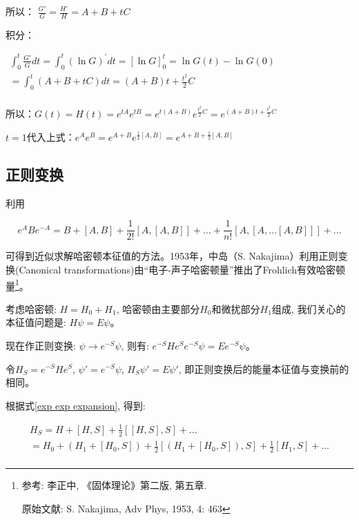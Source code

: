 所以： $\frac{{G'}}{G} = \frac{{H'}}{H} = A + B + tC$



积分：

$\begin{array}{l}
 \int_0^t {\frac{{G'}}{G}dt}  = \int_0^t {\left( {\ln G} \right)^\prime  dt}  = \left[ {\ln G} \right]_0^t  = \ln G\left( t \right) - \ln G\left( 0 \right) \\
  = \int_0^t {\left( {A + B + tC} \right)dt}  = \left( {A + B} \right)t + \frac{{t^2 }}{2}C \\
 \end{array}$


所以：$G\left( t \right) = H\left( t \right) = e^{tA} e^{tB}  = e^{t\left( {A + B} \right)} e^{\frac{{t^2 }}{2}C}  = e^{\left( {A + B} \right)t + \frac{{t^2 }}{2}C} $



$t=1$代入上式：$e^A e^B  = e^{A + B} e^{\frac{1}{2}\left[ {A,B} \right]}  = e^{A + B + \frac{1}{2}\left[ {A,B} \right]} $


\subsection{正则变换}

利用

\begin{equation}\label{exp exp expansion}
 e^A Be^{ - A}  = B + [A,B] + \frac{1}{{2!}}[A,[A,B]] + ... +
\frac{1}{{n!}}[A,[A,...[A,B]]] + ...
\end{equation}


可得到近似求解哈密顿本征值的方法。1953年，中岛（S.
Nakajima）利用正则变换(Canonical
transformations)由``电子-声子哈密顿量''推出了Frohlich有效哈密顿量\footnote{参考:
李正中, 《固体理论》第二版, 第五章.

原始文献: S. Nakajima, Adv Phys, 1953, 4: 463}。

考虑哈密顿: $H = H_0 + H_1$,
哈密顿由主要部分$H_0$和微扰部分$H_1$组成, 我们关心的本征值问题是: $H
\psi = E \psi$。

现在作正则变换: $\psi \to e^{-S} \psi $, 则有: $ e^{-S} H e^S
e^{-S}\psi = E e^{-S} \psi$。

令$H_S = e^{-S} H e^{S}$, $\psi' = e^{-S} \psi$, $H_S \psi' = E
\psi'$, 即正则变换后的能量本征值与变换前的相同。

根据式\ref{exp exp expansion}, 得到:

\begin{equation*}
 \begin{array}{l}
 H_S  = H + [H,S] + \frac{1}{2}[[H,S],S] + ... \\
  = H_0  + \left( {H_1  + [H_0 ,S]} \right) + \frac{1}{2}\left[ {\left( {H_1  + [H_0 ,S]} \right),S} \right] + \frac{1}{2}[H_1 ,S] + ... \\
 \end{array}
\end{equation*}


